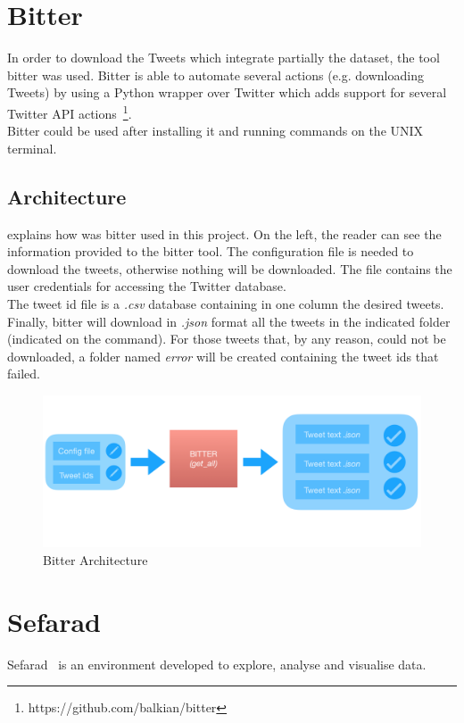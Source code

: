 \section{Bitter}
\label{sec:bitter}
In order to download the Tweets which integrate partially the dataset, the tool bitter was used. Bitter is able to automate several actions (e.g. downloading Tweets) by using a Python wrapper over Twitter which adds support for several Twitter API actions~\footnote{https://github.com/balkian/bitter}.\\
Bitter could be used after installing it and running commands on the UNIX terminal.
\subsection{Architecture}
 explains how was bitter used in this project. On the left, the reader can see the information provided to the bitter tool. The configuration file is needed to download the tweets, otherwise nothing will be downloaded. The file contains the user credentials for accessing the Twitter database.\\ The tweet id file is a \textit{.csv} database containing in one column the desired tweets. Finally, bitter will download in \textit{.json} format all the tweets in the indicated folder (indicated on the command). For those tweets that, by any reason, could not be downloaded, a folder named \textit{error} will be created containing the tweet ids that failed.
\begin{figure}
	\includegraphics[width=\linewidth]{img/bitter.png}
	\caption{Bitter Architecture}
	\label{fig:bitter}
\end{figure}
\section{Sefarad}
Sefarad~\cite{sefarad} is an environment developed to explore, analyse and visualise data. 
